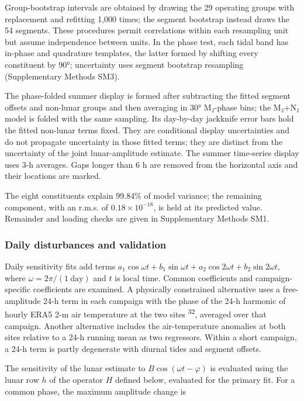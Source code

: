 \documentclass[
  11pt,
  a4paper,
]{article}
\begin{document}
Group-bootstrap intervals are obtained by drawing the 29 operating
groups with replacement and refitting 1,000 times; the segment bootstrap
instead draws the 54 segments. These procedures permit correlations
within each resampling unit but assume independence between units. In
the phase test, each tidal band has in-phase and quadrature templates,
the latter formed by shifting every constituent by 90°; uncertainty uses
segment bootstrap resampling (Supplementary Methods SM3).

The phase-folded summer display is formed after subtracting the fitted
segment offsets and non-lunar groups and then averaging in 30° M₂-phase
bins; the M₂+N₂ model is folded with the same sampling. Its day-by-day
jackknife error bars hold the fitted non-lunar terms fixed. They are
conditional display uncertainties and do not propagate uncertainty in
those fitted terms; they are distinct from the uncertainty of the joint
lunar-amplitude estimate. The summer time-series display uses 3-h
averages. Gaps longer than 6 h are removed from the horizontal axis and
their locations are marked.

The eight constituents explain 99.84\% of model variance; the remaining
component, with an r.m.s. of \(0.18\times10^{-18}\), is held at its
predicted value. Remainder and loading checks are given in Supplementary
Methods SM1.

\hypertarget{daily-disturbances-and-validation}{%
\subsubsection{Daily disturbances and
validation}\label{daily-disturbances-and-validation}}

Daily sensitivity fits add terms
\(a_1\cos\omega t+b_1\sin\omega t+a_2\cos2\omega t+b_2\sin2\omega t\),
where \(\omega=2\pi/(1\ \mathrm{day})\) and \(t\) is local time. Common
coefficients and campaign-specific coefficients are examined. A
physically constrained alternative uses a free-amplitude 24-h term in
each campaign with the phase of the 24-h harmonic of hourly ERA5 2-m air
temperature at the two sites \textsuperscript{32}, averaged over that
campaign. Another alternative includes the air-temperature anomalies at
both sites relative to a 24-h running mean as two regressors. Within a
short campaign, a 24-h term is partly degenerate with diurnal tides and
segment offsets.

The sensitivity of the lunar estimate to \(B\cos(\omega t-\varphi)\) is
evaluated using the lunar row \(h\) of the operator \(H\) defined below,
evaluated for the primary fit. For a common phase, the maximum amplitude
change is
\end{document}

